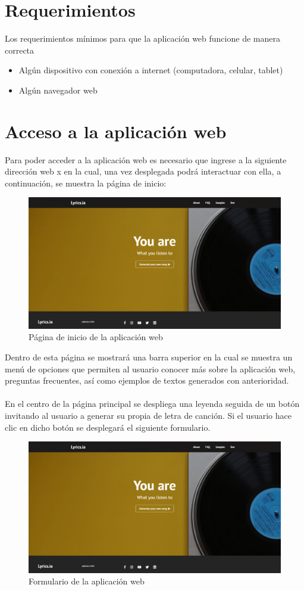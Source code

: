 \documentclass[12pt, a4paper, titlepage]{report}
\begin{document}
	\section{Requerimientos}
	Los requerimientos mínimos para que la aplicación web funcione de manera correcta
	\begin{itemize}
		\item Algún dispositivo con conexión a internet (computadora, celular, tablet)
		\item Algún navegador web
	\end{itemize}

	\section{Acceso a la aplicación web}
	Para poder acceder a la aplicación web es necesario que ingrese a la siguiente dirección web x en la cual, una vez desplegada podrá interactuar con ella, a continuación, se muestra la página de inicio:
	\begin{figure}[H] 
		\includegraphics[width=13.5cm]{./Imagenes/Capturas/x.png}
		\centering \caption{Página de inicio de la aplicación web}
	\end{figure}
	Dentro de esta página se mostrará una barra superior en la cual se muestra un menú de opciones que permiten al usuario conocer más sobre la aplicación web, preguntas frecuentes, así como ejemplos de textos generados con anterioridad.\\\\
	En el centro de la página principal se despliega una leyenda seguida de un botón invitando al usuario a generar su propia de letra de canción. Si el usuario hace clic en dicho botón se desplegará el siguiente formulario.
	\begin{figure}[H] 
		\includegraphics[width=13.5cm]{./Imagenes/Capturas/x.png}
		\centering \caption{Formulario de la aplicación web}
	\end{figure}
\end{document}
